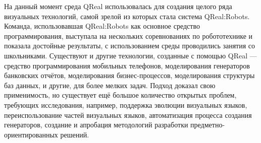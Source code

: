 \documentclass[a4, 12pt]{article}
\begin{document}
На данный момент среда QReal использовалась для создания целого ряда визуальных технологий, самой зрелой из которых стала система QReal:Robots. Команда, использовавшая QReal:Robots как основное средство программирования, выступала на нескольких соревнованиях по робототехнике и показала достойные результаты, с использованием среды проводились занятия со школьниками. Существуют и другие технологии, созданные с помощью QReal --- средство программирования мобильных телефонов, моделирования генераторов банковских отчётов, моделирования бизнес-процессов, моделирования структуры баз данных, и другие, для более мелких задач. Подход доказал свою применимость, но существует ещё большое количество открытых проблем, требующих исследования, например, поддержка эволюции визуальных языков, переиспользование частей визуальных языков, автоматизация процесса создания генераторов, создание и апробация методологий разработки предметно-ориентированных решений.
\end{document}
